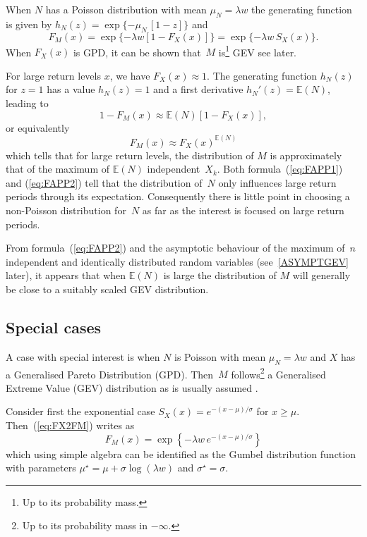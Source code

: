 \documentclass[a4paper]{report}
\newcommand{\Esp}{\mathbb{E}}
\begin{document}
When $N$ has a Poisson distribution with mean $\mu_N=\lambda w$
the generating function is given by
$h_N(z) = \exp\{-\mu_N\,[1-z]\}$ and 
\begin{equation}
  \label{eq:FX2FM}
   F_M(x) = \exp\{- \lambda w  \left[1-F_X(x)\right]\} = 
   \exp\{- \lambda w \,S_X(x) \}. 
\end{equation}
When $F_X(x)$ is GPD, it can be shown that~$M$ is\footnote{Up to its
  probability mass.} GEV see later.

For large return levels $x$, we have $F_X(x) \approx 1$. The generating 
function $h_N(z)$ for $z=1$ has a value $h_N(z)=1$ and a first derivative 
$h_N'(z) = \Esp(N)$, leading to
\begin{equation}
  \label{eq:FAPP1}
   1- F_M(x) \approx \Esp(N)\left[1 - F_X(x)\right],
\end{equation}
or equivalently 
\begin{equation}
  \label{eq:FAPP2}
   F_M(x) \approx F_X(x)^{\Esp(N)} 
\end{equation}
which tells that for large return levels, the distribution of $M$ is
approximately that of the maximum of $\Esp(N)$ independent~$X_k$.
Both formula~(\ref{eq:FAPP1}) and (\ref{eq:FAPP2}) tell that the
distribution of~$N$ only influences large return periods through its
expectation. Consequently there is little point in choosing a
non-Poisson distribution for~$N$ as far as the interest is focused on
large return periods.

From formula~(\ref{eq:FAPP2}) and the asymptotic behaviour of the
maximum of~$n$ independent and identically distributed random
variables (see~\ref{ASYMPTGEV} later), it appears that when $\Esp(N)$
is large the distribution of $M$ will generally be close to a suitably
scaled GEV distribution.

\subsection{Special cases}
\label{SPECIALCASES}

A case with special interest is when $N$ is Poisson with mean
$\mu_N=\lambda w$ and $X$ has a Generalised Pareto Distribution
(GPD).  Then~$M$ follows\footnote{Up to its probability mass in
  $-\infty$.} a Generalised Extreme Value (GEV) distribution as is
usually assumed .

Consider first the exponential case $S_X(x) = e^{-(x - \mu)/\sigma}$ for  
$x \geqslant \mu$. Then~(\ref{eq:FX2FM}) writes as
$$
   F_M(x) = \exp\left\{ -\lambda w \,e^{-(x - \mu)/\sigma} \right\}
$$
which using simple algebra can be identified as the Gumbel
distribution function with parameters $\mu^\star = \mu + \sigma \log
(\lambda w)$ and $\sigma^\star = \sigma$.  
\end{document}
